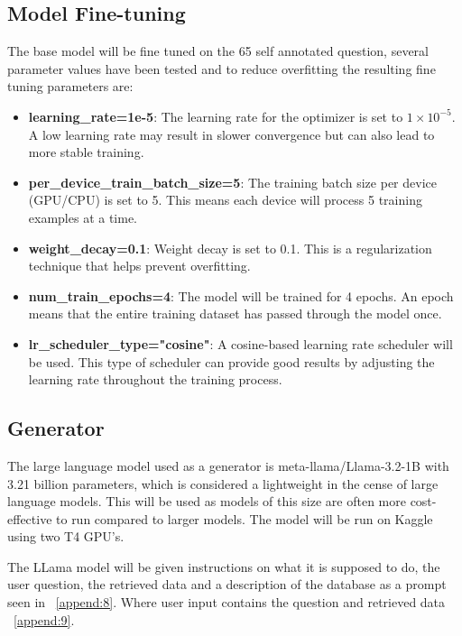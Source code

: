 \documentclass[11pt]{article}
\begin{document}
\subsection{Model Fine-tuning}
The base model will be fine tuned on the 65 self annotated question, several parameter values have been tested and to reduce overfitting the resulting fine tuning parameters are:
\begin{itemize}
    \item \textbf{learning\_rate=1e-5}: The learning rate for the optimizer is set to $1 \times 10^{-5}$. A low learning rate may result in slower convergence but can also lead to more stable training.
    \item \textbf{per\_device\_train\_batch\_size=5}: The training batch size per device (GPU/CPU) is set to 5. This means each device will process 5 training examples at a time.
    \item \textbf{weight\_decay=0.1}: Weight decay is set to 0.1. This is a regularization technique that helps prevent overfitting.
    \item \textbf{num\_train\_epochs=4}: The model will be trained for 4 epochs. An epoch means that the entire training dataset has passed through the model once.
    \item \textbf{lr\_scheduler\_type="cosine"}: A cosine-based learning rate scheduler will be used. This type of scheduler can provide good results by adjusting the learning rate throughout the training process.
\end{itemize}

\subsection{Generator}

The large language model used as a generator is meta-llama/Llama-3.2-1B \cite{Llama} with 3.21 billion parameters, which is considered a lightweight in the cense of large language models\cite{touvron2023llama}. This will be used as models of this size are often more cost-effective to run compared to larger models. The model will be run on Kaggle using two T4 GPU's. 

The LLama model will be given instructions on what it is supposed to do, the user question, the retrieved data and a description of the database as a prompt seen in ~\ref{append:8}. Where user input contains the question and retrieved data ~\ref{append:9}.
\end{document}
